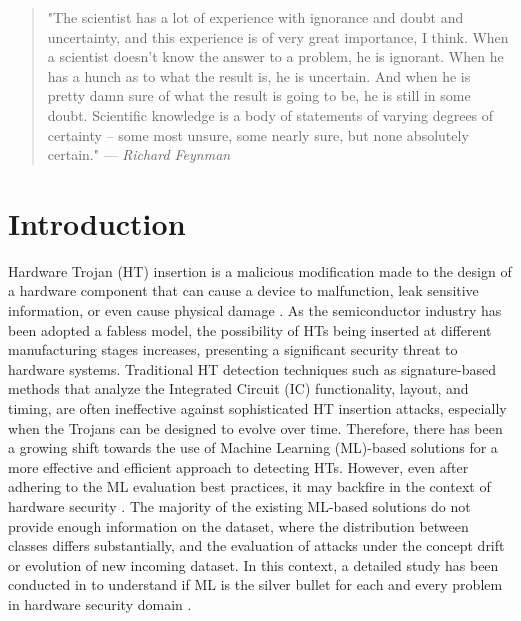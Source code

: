 \begingroup
\RaggedRight

\begin{quote}
"The scientist has a lot of experience with ignorance and doubt and uncertainty, and this experience is of very great importance, I think. When a scientist doesn't know the answer to a problem, he is ignorant. When he has a hunch as to what the result is, he is uncertain. And when he is pretty damn sure of what the result is going to be, he is still in some doubt. Scientific knowledge is a body of statements of varying degrees of certainty -- some most unsure, some nearly sure, but none absolutely certain."
\newline
\hfill — \textit{Richard Feynman}
\end{quote}

\section*{Introduction}
\label{Intro}
Hardware Trojan (HT) insertion is a malicious modification made to the design of a hardware component that can cause a device to malfunction, leak sensitive information, or even cause physical damage \cite{francq2015introduction}. As the semiconductor industry has been adopted a fabless model, the possibility of HTs being inserted at different manufacturing stages increases, presenting a significant security threat to hardware systems. Traditional HT detection techniques such as signature-based methods \cite{gbade2014signature} that analyze the Integrated Circuit (IC) functionality, layout, and timing, are often ineffective against sophisticated HT insertion attacks, especially when the Trojans can be designed to evolve over time. Therefore, there has been a growing shift towards the use of Machine Learning (ML)-based solutions for a more effective and efficient approach to detecting HTs. However, even after adhering to the ML evaluation best practices, it may backfire in the context of hardware security \cite{285613}. The majority of the existing ML-based solutions do not provide enough information on the dataset, where the distribution between classes differs substantially, and the evaluation of attacks under the concept drift or evolution of new incoming dataset. In this context, a detailed study has been conducted in \cite{quiring2022and} to understand if ML is the silver bullet for each and every problem in hardware security domain \cite{liu2021two}.

